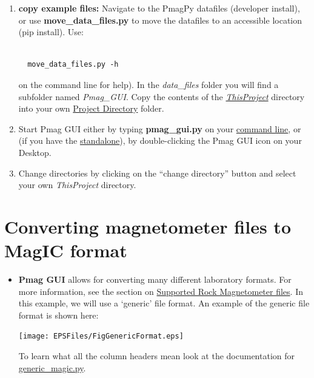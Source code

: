 \documentclass[11pt]{book}
\begin{document}
{\begin{enumerate}
\item \textbf{copy example files:}  Navigate to the PmagPy datafiles (developer install), or use \textbf{move\_data\_files.py} to move the  datafiles to an accessible location (pip install). Use: \begin{verbatim}

  move_data_files.py -h\end{verbatim} on the command line for help).  In the {\it data\_files } folder you will find a subfolder named {\it Pmag\_GUI}. Copy the contents of the  \href{#Project_Directory}{\it ThisProject} directory  into  your  own \href{#Project_Directory}{Project Directory} folder.
 \item Start Pmag GUI either by typing {\bf pmag\_gui.py} on your \href{#command_line}{command line}, or (if you have the \href{#standalone}{standalone}), by double-clicking the Pmag GUI icon on your Desktop.
 \item Change directories by clicking  on the ``change directory'' button and select your own {\it ThisProject} directory.
 \end{enumerate}


\section{Converting magnetometer files to MagIC format}
\begin{itemize}
\item {\bf Pmag GUI} allows for converting many different laboratory formats.  For more information, see the section on \href{#magnetometer_files}{Supported Rock Magnetometer files}.   In this example, we will use a `generic' file format.
An example of the generic file format is shown here:

\texttt{[image: EPSFiles/FigGenericFormat.eps]}

To learn what all the column headers mean look at the documentation for \href{#generic_magic.py}{generic\_magic.py}.

%


\end{itemize}}
\end{document}
